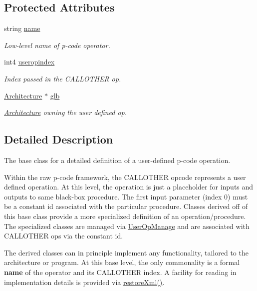 \subsection*{Protected Attributes}
\begin{DoxyCompactItemize}
\item 
string \mbox{\hyperlink{class_user_pcode_op_acb610a4cec8ff71dc665819de35c420e}{name}}
\begin{DoxyCompactList}\small\item\em Low-\/level name of p-\/code operator. \end{DoxyCompactList}\item 
int4 \mbox{\hyperlink{class_user_pcode_op_a07ff8241ba9760ead296a62a8b51e8ad}{useropindex}}
\begin{DoxyCompactList}\small\item\em Index passed in the C\+A\+L\+L\+O\+T\+H\+ER op. \end{DoxyCompactList}\item 
\mbox{\hyperlink{class_architecture}{Architecture}} $\ast$ \mbox{\hyperlink{class_user_pcode_op_a38b36d24c48e4618c20ec3c56b90e6d7}{glb}}
\begin{DoxyCompactList}\small\item\em \mbox{\hyperlink{class_architecture}{Architecture}} owning the user defined op. \end{DoxyCompactList}\end{DoxyCompactItemize}


\subsection{Detailed Description}
The base class for a detailed definition of a user-\/defined p-\/code operation. 

Within the raw p-\/code framework, the C\+A\+L\+L\+O\+T\+H\+ER opcode represents a user defined operation. At this level, the operation is just a placeholder for inputs and outputs to same black-\/box procedure. The first input parameter (index 0) must be a constant id associated with the particular procedure. Classes derived off of this base class provide a more specialized definition of an operation/procedure. The specialized classes are managed via \mbox{\hyperlink{class_user_op_manage}{User\+Op\+Manage}} and are associated with C\+A\+L\+L\+O\+T\+H\+ER ops via the constant id.

The derived classes can in principle implement any functionality, tailored to the architecture or program. At this base level, the only commonality is a formal {\bfseries{name}} of the operator and its C\+A\+L\+L\+O\+T\+H\+ER index. A facility for reading in implementation details is provided via \mbox{\hyperlink{class_user_pcode_op_a2a7b7c637369bc4fba4604cd83a937af}{restore\+Xml()}}. 

